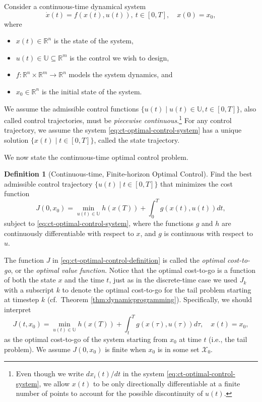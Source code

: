 \documentclass[
]{book}
\theoremstyle{definition}
\newtheorem{definition}{Definition}[chapter]
\theoremstyle{definition}
\theoremstyle{definition}
\theoremstyle{definition}
\theoremstyle{remark}
\begin{document}
Consider a continuous-time dynamical system
\begin{equation}
\dot{x}(t) = f(x(t),u(t)),\ t \in [0,T], \quad x(0) = x_0,
\label{eq:ct-optimal-control-system}
\end{equation}
where

\begin{itemize}
\item
  \(x(t) \in \mathbb{R}^n\) is the state of the system,
\item
  \(u(t) \in \mathbb{U} \subseteq \mathbb{R}^m\) is the control we wish to design,
\item
  \(f: \mathbb{R}^{n} \times \mathbb{R}^m \rightarrow \mathbb{R}^n\) models the system dynamics, and
\item
  \(x_0 \in \mathbb{R}^n\) is the initial state of the system.
\end{itemize}

We assume the admissible control functions \(\{u(t) \mid u(t) \in \mathbb{U}, t\in [0,T] \}\), also called control trajectories, must be \emph{piecewise continuous}.\footnote{Even though we write \(dx_i(t)/dt\) in the system \eqref{eq:ct-optimal-control-system}, we allow \(x(t)\) to be only directionally differentiable at a finite number of points to account for the possible discontinuity of \(u(t)\).} For any control trajectory, we assume the system \eqref{eq:ct-optimal-control-system} has a unique solution \(\{x(t)\mid t \in [0,T] \}\), called the state trajectory.

We now state the continuous-time optimal control problem.

\begin{definition}[Continuous-time, Finite-horizon Optimal Control]
\protect\hypertarget{def:continuoustimeoptimalcontrol}{}\label{def:continuoustimeoptimalcontrol}Find the best admissible control trajectory \(\{u(t) \mid t \in [0,T] \}\) that minimizes the cost function
\begin{equation}
J(0,x_0) = \min_{u(t) \in \mathbb{U}} h(x(T)) + \int_0^T g(x(t),u(t)) dt,
\label{eq:ct-optimal-control-definition}
\end{equation}
subject to \eqref{eq:ct-optimal-control-system}, where the functions \(g\) and \(h\) are continuously differentiable with respect to \(x\), and \(g\) is continuous with respect to \(u\).
\end{definition}

The function \(J\) in \eqref{eq:ct-optimal-control-definition} is called the \emph{optimal cost-to-go}, or the \emph{optimal value function}. Notice that the optimal cost-to-go is a function of both the state \(x\) and the time \(t\), just as in the discrete-time case we used \(J_k\) with a subscript \(k\) to denote the optimal cost-to-go for the tail problem starting at timestep \(k\) (cf.~Theorem \ref{thm:dynamicprogramming}). Specifically, we should interpret
\[
J(t,x_0) = \min_{u(t) \in \mathbb{U}} h(x(T)) + \int_t^T g(x(\tau),u(\tau)) d\tau, \quad x(t) = x_0,
\]
as the optimal cost-to-go of the system starting from \(x_0\) at time \(t\) (i.e., the tail problem).
We assume \(J(0,x_0)\) is finite when \(x_0\) is in some set \(\mathcal{X}_0\).
\end{document}
